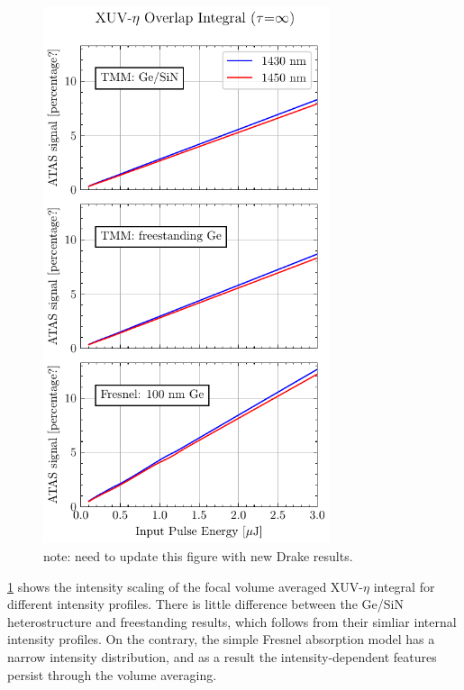 \begin{figure}
	\centering
	\includegraphics[width=0.75\textwidth]{figures/chap4/FVA_XUV_signal.pdf}
	\caption{note: need to update this figure with new Drake results.}
	\label{fig:FVA_XUV_signal}
\end{figure}

\cref{fig:FVA_XUV_signal} shows the intensity scaling of the focal volume averaged XUV-$\eta$ integral for different intensity profiles. There is little difference between the Ge/SiN heterostructure and freestanding results, which follows from their simliar internal intensity profiles. On the contrary, the simple Fresnel absorption model has a narrow intensity distribution, and as a result the intensity-dependent features persist through the volume averaging.

